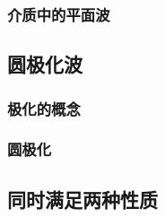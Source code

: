 \documentclass[UTF8,linespread=1.236]{ctexart}
\begin{document}
\subsubsection{介质中的平面波}

\subsection{圆极化波}

\subsubsection{极化的概念}

\subsubsection{圆极化}

\subsection{同时满足两种性质}


\end{document}
